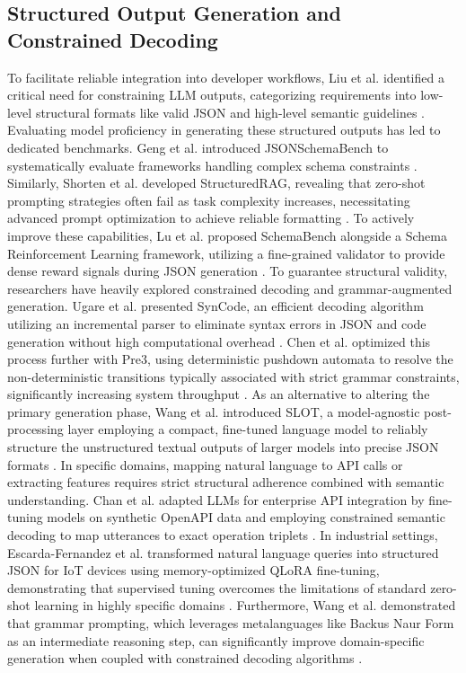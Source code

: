 \documentclass[journal,article,submit,pdftex,moreauthors]{Definitions/mdpi}
\begin{document}
\subsection{Structured Output Generation and Constrained Decoding}
To facilitate reliable integration into developer workflows, Liu et al. identified a critical need for constraining LLM outputs, categorizing requirements into low-level structural formats like valid JSON and high-level semantic guidelines \citep{liu2024we}. Evaluating model proficiency in generating these structured outputs has led to dedicated benchmarks. Geng et al. introduced JSONSchemaBench to systematically evaluate frameworks handling complex schema constraints \citep{geng2025jsonschemabench}. Similarly, Shorten et al. developed StructuredRAG, revealing that zero-shot prompting strategies often fail as task complexity increases, necessitating advanced prompt optimization to achieve reliable formatting \citep{shorten2024structuredrag}. To actively improve these capabilities, Lu et al. proposed SchemaBench alongside a Schema Reinforcement Learning framework, utilizing a fine-grained validator to provide dense reward signals during JSON generation \citep{lu2025learning}.
To guarantee structural validity, researchers have heavily explored constrained decoding and grammar-augmented generation. Ugare et al. presented SynCode, an efficient decoding algorithm utilizing an incremental parser to eliminate syntax errors in JSON and code generation without high computational overhead \citep{ugare2025syncode}. Chen et al. optimized this process further with Pre3, using deterministic pushdown automata to resolve the non-deterministic transitions typically associated with strict grammar constraints, significantly increasing system throughput \citep{chen2025pre3}. As an alternative to altering the primary generation phase, Wang et al. introduced SLOT, a model-agnostic post-processing layer employing a compact, fine-tuned language model to reliably structure the unstructured textual outputs of larger models into precise JSON formats \citep{wang2025slot}.
In specific domains, mapping natural language to API calls or extracting features requires strict structural adherence combined with semantic understanding. Chan et al. adapted LLMs for enterprise API integration by fine-tuning models on synthetic OpenAPI data and employing constrained semantic decoding to map utterances to exact operation triplets \citep{chan2024adapting}. In industrial settings, Escarda-Fernandez et al. transformed natural language queries into structured JSON for IoT devices using memory-optimized QLoRA fine-tuning, demonstrating that supervised tuning overcomes the limitations of standard zero-shot learning in highly specific domains \citep{escarda2024llms}. Furthermore, Wang et al. demonstrated that grammar prompting, which leverages metalanguages like Backus Naur Form as an intermediate reasoning step, can significantly improve domain-specific generation when coupled with constrained decoding algorithms \citep{wang2023grammar}. 
\end{document}
